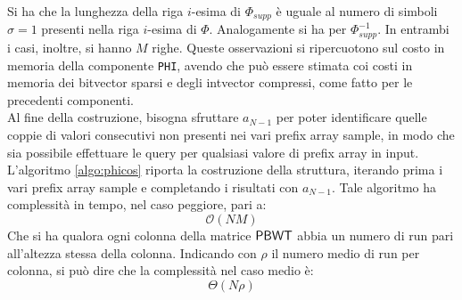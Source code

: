 Si ha che la lunghezza della riga $i$-esima di $\varPhi_{supp}$ è
uguale al numero di simboli $\sigma=1$ presenti nella riga $i$-esima di
$\varPhi$. Analogamente 
si ha per $\varPhi^{-1}_{supp}$. In entrambi i casi, inoltre, si hanno $M$
righe. Queste osservazioni si ripercuotono sul costo in memoria della componente
\texttt{PHI}, avendo che può essere stimata coi costi in memoria dei bitvector
sparsi e degli intvector compressi, come fatto per le precedenti componenti.\\ 
Al fine della costruzione, bisogna sfruttare $a_{N-1}$ per poter
identificare quelle coppie di valori consecutivi non presenti nei vari
prefix array sample, in modo che sia possibile effettuare le query per
qualsiasi valore di prefix array in input.\\
L'algoritmo \ref{algo:phicos} riporta la costruzione della struttura,
iterando prima i vari prefix array sample e completando i
risultati con $a_{N-1}$. Tale algoritmo ha complessità in tempo, nel caso
peggiore, pari a:
\begin{equation}
  \label{eq:phicos}
  \mathcal{O}(NM)
\end{equation}
Che si ha qualora ogni colonna della matrice $\mbox{\rm {\sf PBWT}}$ abbia un numero di
run pari all'altezza stessa della colonna. Indicando con $\rho$ il numero medio
di run per colonna, si può dire che la complessità nel caso medio è:
\begin{equation}
  \label{eq:phicos2}
  \varTheta(N\rho)
\end{equation}
